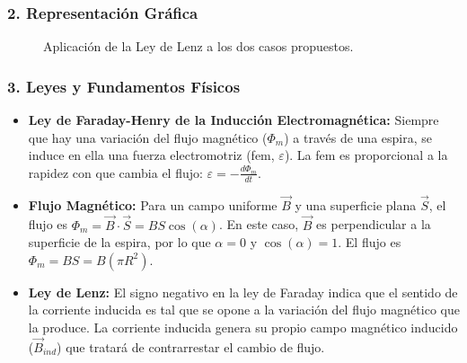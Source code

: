 \subsubsection*{2. Representación Gráfica}
\begin{figure}[H]
    \centering
    \hfill
    \caption{Aplicación de la Ley de Lenz a los dos casos propuestos.}
\end{figure}

\subsubsection*{3. Leyes y Fundamentos Físicos}
\begin{itemize}
    \item \textbf{Ley de Faraday-Henry de la Inducción Electromagnética:} Siempre que hay una variación del flujo magnético ($\Phi_m$) a través de una espira, se induce en ella una fuerza electromotriz (fem, $\varepsilon$). La fem es proporcional a la rapidez con que cambia el flujo: $\varepsilon = -\frac{d\Phi_m}{dt}$.
    \item \textbf{Flujo Magnético:} Para un campo uniforme $\vec{B}$ y una superficie plana $\vec{S}$, el flujo es $\Phi_m = \vec{B} \cdot \vec{S} = B S \cos(\alpha)$. En este caso, $\vec{B}$ es perpendicular a la superficie de la espira, por lo que $\alpha=0$ y $\cos(\alpha)=1$. El flujo es $\Phi_m = B S = B (\pi R^2)$.
    \item \textbf{Ley de Lenz:} El signo negativo en la ley de Faraday indica que el sentido de la corriente inducida es tal que se opone a la variación del flujo magnético que la produce. La corriente inducida genera su propio campo magnético inducido ($\vec{B}_{ind}$) que tratará de contrarrestar el cambio de flujo.
\end{itemize}

